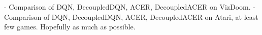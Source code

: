 - Comparison of DQN, DecoupledDQN, ACER, DecoupledACER on VizDoom.
- Comparison of DQN, DecoupledDQN, ACER, DecoupledACER on Atari, at least few
  games. Hopefully as much as possible.
